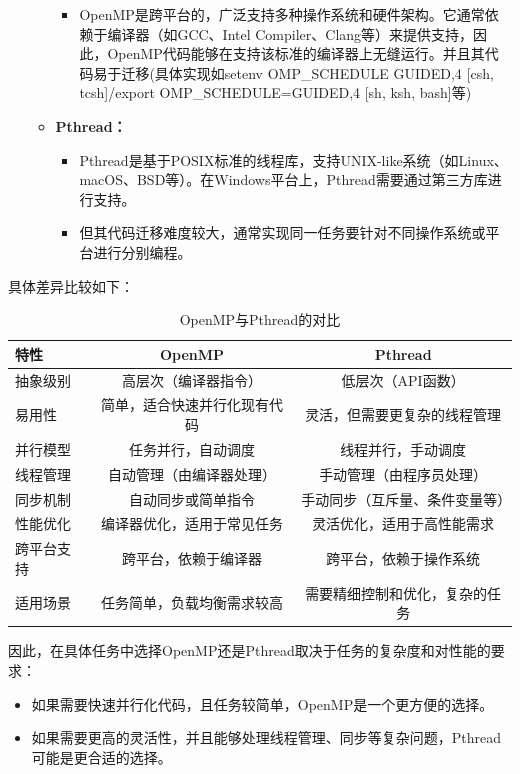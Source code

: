 \documentclass{nku}
\begin{document}
\begin{enumerate}
\begin{itemize}
        \begin{itemize}
            \item OpenMP是跨平台的，广泛支持多种操作系统和硬件架构。它通常依赖于编译器（如GCC、Intel Compiler、Clang等）来提供支持，因此，OpenMP代码能够在支持该标准的编译器上无缝运行。并且其代码易于迁移(具体实现如setenv OMP\_SCHEDULE GUIDED,4 [csh, tcsh]/export OMP\_SCHEDULE=GUIDED,4 [sh, ksh, bash]等)
        \end{itemize}
        \item \textbf{Pthread：}
        \begin{itemize}
            \item Pthread是基于POSIX标准的线程库，支持UNIX-like系统（如Linux、macOS、BSD等）。在Windows平台上，Pthread需要通过第三方库进行支持。
            \item 但其代码迁移难度较大，通常实现同一任务要针对不同操作系统或平台进行分别编程。
        \end{itemize}
    \end{itemize}
\end{enumerate}

具体差异比较如下：
\begin{table}[H]
    \centering
    \caption{OpenMP与Pthread的对比}
    \begin{tabular}{lcc}
    \toprule
    \textbf{特性} & \textbf{OpenMP} & \textbf{Pthread} \\
    \midrule
    抽象级别 & 高层次（编译器指令） & 低层次（API函数） \\
    易用性 & 简单，适合快速并行化现有代码 & 灵活，但需要更复杂的线程管理 \\
    并行模型 & 任务并行，自动调度 & 线程并行，手动调度 \\
    线程管理 & 自动管理（由编译器处理） & 手动管理（由程序员处理） \\
    同步机制 & 自动同步或简单指令 & 手动同步（互斥量、条件变量等） \\
    性能优化 & 编译器优化，适用于常见任务 & 灵活优化，适用于高性能需求 \\
    跨平台支持 & 跨平台，依赖于编译器 & 跨平台，依赖于操作系统 \\
    适用场景 & 任务简单，负载均衡需求较高 & 需要精细控制和优化，复杂的任务 \\
    \bottomrule
    \end{tabular}
    \label{table:OpenMP_vs_Pthread}
\end{table}

因此，在具体任务中选择OpenMP还是Pthread取决于任务的复杂度和对性能的要求：
\begin{itemize}
    \item 如果需要快速并行化代码，且任务较简单，OpenMP是一个更方便的选择。
    \item 如果需要更高的灵活性，并且能够处理线程管理、同步等复杂问题，Pthread可能是更合适的选择。
\end{itemize}
\end{document}
